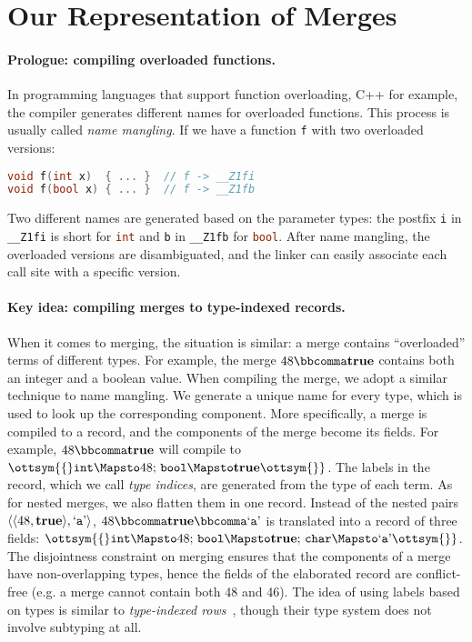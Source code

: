 \section{Our Representation of Merges}

\paragraph{Prologue: compiling overloaded functions.}
In programming languages that support function overloading, C++ for example, the
compiler generates different names for overloaded functions. This process is
usually called \emph{name mangling}. If we have a function \lstinline{f} with
two overloaded versions:
\begin{lstlisting}[language=C++]
void f(int x)  { ... }  // f -> __Z1fi
void f(bool x) { ... }  // f -> __Z1fb
\end{lstlisting}
Two different names are generated based on the parameter types: the postfix
\lstinline{i} in \lstinline{__Z1fi} is short for \lstinline[language=C++]{int}
and \lstinline{b} in \lstinline{__Z1fb} for \lstinline[language=C++]{bool}.
After name mangling, the overloaded versions are disambiguated, and the linker
can easily associate each call site with a specific version.

\paragraph{Key idea: compiling merges to type-indexed records.}
When it comes to merging, the situation is similar: a merge contains
``overloaded'' terms of different types. For example, the merge $48  \bbcomma   \mathbf{true} $
contains both an integer and a boolean value. When compiling the merge, we adopt
a similar technique to name mangling. We generate a unique name for every type,
which is used to look up the corresponding component. More specifically, a merge
is compiled to a record, and the components of the merge become its fields. For
example, $48  \bbcomma   \mathbf{true} $ will compile to $\ottsym{\{}   \mathtt{int}   \Mapsto  48  ; \,   \mathtt{bool}   \Mapsto   \mathbf{true}   \ottsym{\}}$. The
labels in the record, which we call \emph{type indices}, are generated from the
type of each term. As for nested merges, we also flatten them in one record.
Instead of the nested pairs $ \langle   \langle  48 ,   \mathbf{true}   \rangle  ,   \text{`\texttt{a}'}   \rangle $, $48  \bbcomma   \mathbf{true}   \bbcomma   \text{`\texttt{a}'} $ is translated
into a record of three fields: $\ottsym{\{}   \mathtt{int}   \Mapsto  48  ; \,   \mathtt{bool}   \Mapsto   \mathbf{true}   ; \,   \mathtt{char}   \Mapsto   \text{`\texttt{a}'}   \ottsym{\}}$. The
disjointness constraint on merging ensures that the components of a merge have
non-overlapping types, hence the fields of the elaborated record are
conflict-free (e.g. a merge cannot contain both \textsf{48} and \textsf{46}).
The idea of using labels based on types is similar to \emph{type-indexed
rows}~\citep{shields2001type}, though their type system does not involve
subtyping at all.

